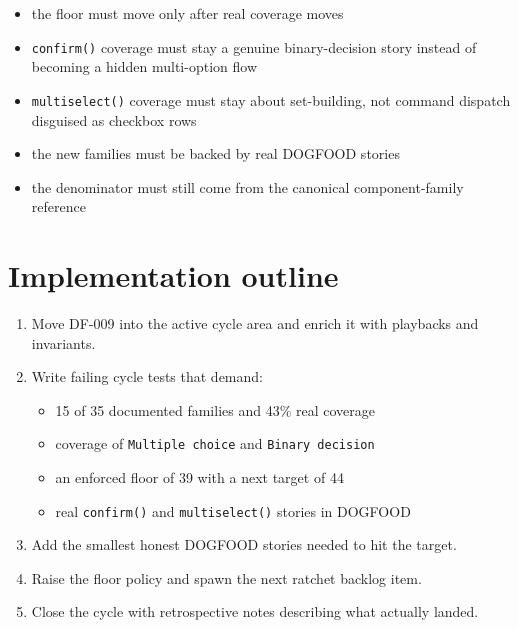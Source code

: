 \begin{itemize}
\tightlist
\item
  the floor must move only after real coverage moves
\item
  \texttt{c\allowbreak{}o\allowbreak{}n\allowbreak{}f\allowbreak{}i\allowbreak{}r\allowbreak{}m\allowbreak{}(\allowbreak{})} coverage must stay a genuine binary-decision story instead of becoming a hidden multi-option flow
\item
  \texttt{m\allowbreak{}u\allowbreak{}l\allowbreak{}t\allowbreak{}i\allowbreak{}s\allowbreak{}e\allowbreak{}l\allowbreak{}e\allowbreak{}c\allowbreak{}t\allowbreak{}(\allowbreak{})} coverage must stay about set-building, not command dispatch disguised as checkbox rows
\item
  the new families must be backed by real DOGFOOD stories
\item
  the denominator must still come from the canonical component-family reference
\end{itemize}

\section{Implementation outline}\label{record-071-implementation-outline}

\begin{enumerate}
\def\labelenumi{\arabic{enumi}.}
\tightlist
\item
  Move DF-009 into the active cycle area and enrich it with playbacks and invariants.
\item
  Write failing cycle tests that demand:

  \begin{itemize}
  \tightlist
  \item
    15 of 35 documented families and 43\% real coverage
  \item
    coverage of \texttt{M\allowbreak{}u\allowbreak{}l\allowbreak{}t\allowbreak{}i\allowbreak{}p\allowbreak{}l\allowbreak{}e\allowbreak{} \allowbreak{}c\allowbreak{}h\allowbreak{}o\allowbreak{}i\allowbreak{}c\allowbreak{}e} and \texttt{B\allowbreak{}i\allowbreak{}n\allowbreak{}a\allowbreak{}r\allowbreak{}y\allowbreak{} \allowbreak{}d\allowbreak{}e\allowbreak{}c\allowbreak{}i\allowbreak{}s\allowbreak{}i\allowbreak{}o\allowbreak{}n}
  \item
    an enforced floor of 39 with a next target of 44
  \item
    real \texttt{c\allowbreak{}o\allowbreak{}n\allowbreak{}f\allowbreak{}i\allowbreak{}r\allowbreak{}m\allowbreak{}(\allowbreak{})} and \texttt{m\allowbreak{}u\allowbreak{}l\allowbreak{}t\allowbreak{}i\allowbreak{}s\allowbreak{}e\allowbreak{}l\allowbreak{}e\allowbreak{}c\allowbreak{}t\allowbreak{}(\allowbreak{})} stories in DOGFOOD
  \end{itemize}
\item
  Add the smallest honest DOGFOOD stories needed to hit the target.
\item
  Raise the floor policy and spawn the next ratchet backlog item.
\item
  Close the cycle with retrospective notes describing what actually landed.
\end{enumerate}

